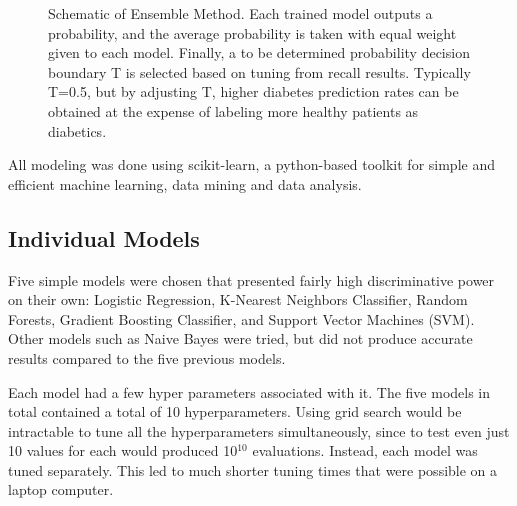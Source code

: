 \documentclass{article} %
\begin{document}
\begin{figure}

\begin{center}
\end{center}
\caption{Schematic of Ensemble Method. Each trained model outputs a probability, and the average probability is taken with equal weight given to each model. Finally, a to be determined probability decision boundary T is selected based on tuning from recall results. Typically T=0.5, but by adjusting T, higher diabetes prediction rates can be obtained at the expense of labeling more healthy patients as diabetics.}
\label{ensemble_scematic}
\end{figure}

All modeling was done using scikit-learn, a python-based toolkit for simple and efficient machine learning, data mining and data analysis\cite{scikit-learn}. 

\subsection{Individual Models}
Five simple models were chosen that presented fairly high discriminative power on their own: Logistic Regression, K-Nearest Neighbors Classifier, Random Forests, Gradient Boosting Classifier, and Support Vector Machines (SVM). Other models such as Naive Bayes were tried, but did not produce accurate results compared to the five previous models. 

Each model had a few hyper parameters associated with it. The five models in total contained a total of 10 hyperparameters. Using grid search would be intractable to tune all the hyperparameters simultaneously, since to test even just 10 values for each would produced 10$^{10}$ evaluations. Instead, each model was tuned separately. This led to much shorter tuning times that were possible on a laptop computer. 
\end{document}
